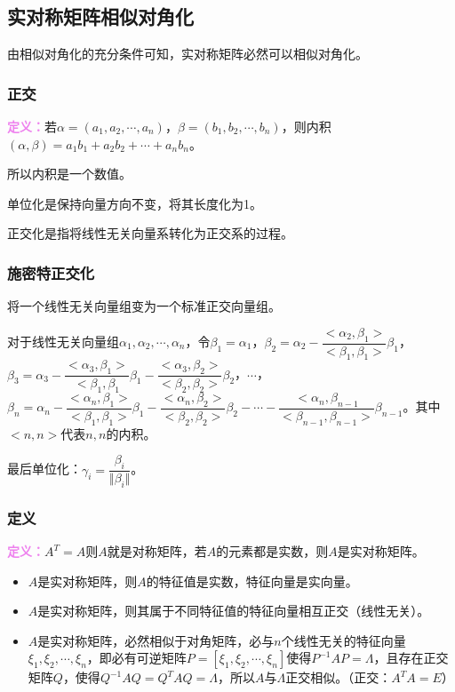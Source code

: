 \documentclass[UTF8, 12pt]{ctexart}
\begin{document}
\subsection{实对称矩阵相似对角化}

由相似对角化的充分条件可知，实对称矩阵必然可以相似对角化。

\subsubsection{正交}

\textcolor{violet}{\textbf{定义：}}若$\alpha=(a_1,a_2,\cdots,a_n)$，$\beta=(b_1,b_2,\cdots,b_n)$，则内积$(\alpha,\beta)=a_1b_1+a_2b_2+\cdots+a_nb_n$。

所以内积是一个数值。

单位化是保持向量方向不变，将其长度化为1。

正交化是指将线性无关向量系转化为正交系的过程。

\subsubsection{施密特正交化}

将一个线性无关向量组变为一个标准正交向量组。

对于线性无关向量组$\alpha_1,\alpha_2,\cdots,\alpha_n$，令$\beta_1=\alpha_1$，$\beta_2=\alpha_2-\dfrac{<\alpha_2,\beta_1>}{<\beta_1,\beta_1>}\beta_1$，$\beta_3=\alpha_3-\dfrac{<\alpha_3,\beta_1>}{<\beta_1,\beta_1}\beta_1-\dfrac{<\alpha_3,\beta_2>}{<\beta_2,\beta_2>}\beta_2$，$\cdots$，$\beta_n=\alpha_n-\dfrac{<\alpha_n,\beta_1>}{<\beta_1,\beta_1>}\beta_1-\dfrac{<\alpha_n,\beta_2>}{<\beta_2,\beta_2>}\beta_2-\cdots-\dfrac{<\alpha_n,\beta_{n-1}}{<\beta_{n-1},\beta_{n-1}>}\beta_{n-1}$。其中$<n,n>$代表$n,n$的内积。

最后单位化：$\gamma_i=\dfrac{\beta_i}{\Vert\beta_i\Vert}$。

\subsubsection{定义}

\textcolor{violet}{\textbf{定义：}}$A^T=A$则$A$就是对称矩阵，若$A$的元素都是实数，则$A$是实对称矩阵。

\begin{itemize}
    \item $A$是实对称矩阵，则$A$的特征值是实数，特征向量是实向量。
    \item $A$是实对称矩阵，则其属于不同特征值的特征向量相互正交（线性无关）。
    \item $A$是实对称矩阵，必然相似于对角矩阵，必与$n$个线性无关的特征向量$\xi_1,\xi_2,\cdots,\xi_n$，即必有可逆矩阵$P=[\xi_1,\xi_2,\cdots,\xi_n]$使得$P^{-1}AP=\Lambda$，且存在正交矩阵$Q$，使得$Q^{-1}AQ=Q^TAQ=\Lambda$，所以$A$与$\Lambda$正交相似。（正交：$A^TA=E$）
\end{itemize}
\end{document}
